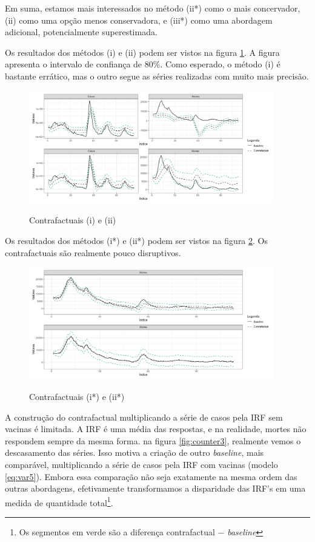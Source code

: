 \documentclass[
    article,
	12pt,				%
	oneside,			%
	a4paper,			%
	english,			%
	brazil,				%
	hyperref = {colorlinks, citecolor=c1d, linkcolor=c2d, urlcolor=c3d, colorlinks}
	]{abntex2}
\newcounter{j}
\begin{document}
Em suma, estamos mais interessados no método (ii*) como o mais concervador, (ii) como uma opção menos conservadora, e (iii*) como uma abordagem adicional, potencialmente superestimada.

Os resultados dos métodos (i) e (ii) podem ser vistos na figura \ref{fig:counter1}. A figura apresenta o intervalo de confiança de $80$\%. Como esperado, o método (i) é bastante errático, mas o outro segue as séries realizadas com muito mais precisão.

\begin{figure}[H]
    \centering
    \caption{Contrafactuais (i) e (ii)}
    \includegraphics[width = 0.95\textwidth]{Figures/res2_cf1-2.png}
    \label{fig:counter1}
\end{figure}

Os resultados dos métodos (i*) e (ii*) podem ser vistos na figura \ref{fig:counter2}. Os contrafactuais são realmente pouco disruptivos.

\begin{figure}[H]
    \centering
    \caption{Contrafactuais (i*) e (ii*)}
    \includegraphics[width = 0.95\textwidth]{Figures/res2_cf4-5.png}
    \label{fig:counter2}
\end{figure}

A construção do contrafactual multiplicando a série de casos pela IRF sem vacinas é limitada. A IRF é uma média das respostas, e na realidade, mortes não respondem sempre da mesma forma. na figura \ref{fig:counter3}, realmente vemos o descasamento das séries. Isso motiva a criação de outro \textit{baseline}, mais comparável, multiplicando a série de casos pela IRF com vacinas (modelo \eqref{eq:var5}). Embora essa comparação não seja exatamente na mesma ordem das outras abordagens, efetivamente transformamos a disparidade das IRF's em uma medida de quantidade total\footnote{Os segmentos em verde são a diferença contrafactual $-$ \textit{baseline}}.
\end{document}
